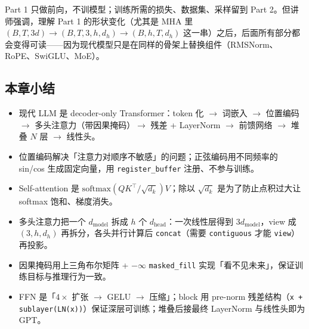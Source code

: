 Part 1 只做前向，不训模型；训练所需的损失、数据集、采样留到 Part 2。但讲师强调，理解 Part 1 的形状变化（尤其是 MHA 里 $(B,T,3d)\rightarrow(B,T,3,h,d_h)\rightarrow(B,h,T,d_h)$ 这一串）之后，后面所有部分都会变得可读——因为现代模型只是在同样的骨架上替换组件（RMSNorm、RoPE、SwiGLU、MoE）。

\subsection{本章小结}
\begin{itemize}
\item 现代 LLM 是 decoder-only Transformer：token 化 $\rightarrow$ 词嵌入 $\rightarrow$ 位置编码 $\rightarrow$ 多头注意力（带因果掩码）$\rightarrow$ 残差 + LayerNorm $\rightarrow$ 前馈网络 $\rightarrow$ 堆叠 $N$ 层 $\rightarrow$ 线性头。
\item 位置编码解决「注意力对顺序不敏感」的问题；正弦编码用不同频率的 sin/cos 生成固定向量，用 \texttt{register\_buffer} 注册、不参与训练。
\item Self-attention 是 $\mathrm{softmax}(QK^{\top}/\sqrt{d_k})V$；除以 $\sqrt{d_k}$ 是为了防止点积过大让 softmax 饱和、梯度消失。
\item 多头注意力把一个 $d_{\text{model}}$ 拆成 $h$ 个 $d_{\text{head}}$：一次线性层得到 $3d_{\text{model}}$，view 成 $(3,h,d_h)$ 再拆分，各头并行计算后 \texttt{concat}（需要 \texttt{contiguous} 才能 \texttt{view}）再投影。
\item 因果掩码用上三角布尔矩阵 + $-\infty$ \texttt{masked\_fill} 实现「看不见未来」，保证训练目标与推理行为一致。
\item FFN 是「$4\times$ 扩张 $\rightarrow$ GELU $\rightarrow$ 压缩」；block 用 pre-norm 残差结构（\texttt{x + sublayer(LN(x))}）保证深层可训练；堆叠后接最终 LayerNorm 与线性头即为 GPT。
\end{itemize}
